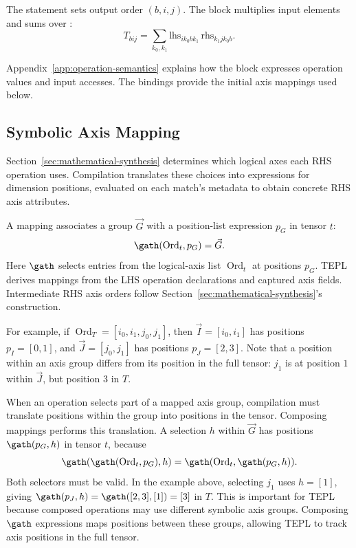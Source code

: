 The statement  sets output order $(b,i,j)$.
The  block multiplies input elements and sums over
:
\begin{equation}
 T_{b i j}=\sum_{k_0,k_1}
 \mathrm{lhs}_{i k_0 b k_1}\,\mathrm{rhs}_{k_1 j k_0 b}.
\end{equation}

Appendix~\ref{app:operation-semantics} explains how the 
block expresses operation values and input accesses.
The bindings provide the initial axis mappings used below.

\subsection{Symbolic Axis Mapping}
\label{sec:symbolic-axis-mapping}
Section~\ref{sec:mathematical-synthesis} determines which logical axes each
RHS operation uses. Compilation translates these choices into expressions
for dimension positions, evaluated on each match's metadata to obtain
concrete RHS axis attributes.

A mapping associates a group $\vec G$ with a position-list expression
$p_G$ in tensor $t$:
\begin{equation}
 \gath(\operatorname{Ord}_t,p_G)=\vec G.
 \label{eq:mapping}
\end{equation}
Here $\gath$ selects entries from the logical-axis list
$\operatorname{Ord}_t$ at positions $p_G$. TEPL derives mappings from
the LHS operation declarations and captured axis fields. Intermediate
RHS axis orders follow Section~\ref{sec:mathematical-synthesis}'s construction.

For example, if $\operatorname{Ord}_T=[i_0,i_1,j_0,j_1]$, then
$\vec I=[i_0,i_1]$ has positions $p_I=[0,1]$, and
$\vec J=[j_0,j_1]$ has positions $p_J=[2,3]$.
Note that a position within an axis group differs from its position
in the full tensor: $j_1$ is at position $1$ within $\vec J$, but
position $3$ in $T$.

When an operation selects part of a mapped axis group, compilation must
translate positions within the group into positions in the tensor.
Composing mappings performs this translation. A selection $h$ within
$\vec G$ has positions $\gath(p_G,h)$ in tensor $t$, because
\begin{equation}
 \gath(\gath(\operatorname{Ord}_t,p_G),h)
 =\gath(\operatorname{Ord}_t,\gath(p_G,h)).
 \label{eq:gather-composition}
\end{equation}
Both selectors must be valid. In the example above, selecting $j_1$
uses $h=[1]$, giving
$\gath(p_J,h)=\gath([2,3],[1])=[3]$ in $T$.
This is important for TEPL because composed operations may use different
symbolic axis groups. Composing $\gath$ expressions maps positions between
these groups, allowing TEPL to track axis positions in the full tensor.

